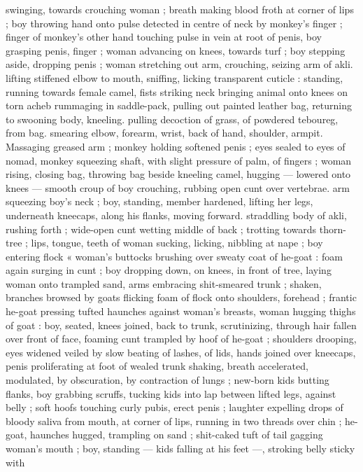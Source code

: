 swinging, towards crouching woman ; breath making blood froth at
corner of lips ; boy throwing hand onto pulse detected in centre of
neck by monkey's finger ; finger of monkey's other hand touching
pulse in vein at root of penis, boy grasping penis, finger ; woman
advancing on knees, towards turf ; boy stepping aside, dropping
penis ; woman stretching out arm, crouching, seizing arm of akli.
lifting stiffened elbow to mouth, sniffing, licking transparent cuticle :
standing, running towards female camel, fists striking neck bringing
animal onto knees on torn acheb rummaging in saddle-pack, pulling
out painted leather bag, returning to swooning body, kneeling.
pulling decoction of grass, of powdered teboureg, from bag.
smearing elbow, forearm, wrist, back of hand, shoulder, armpit.
Massaging greased arm ; monkey holding softened penis ; eyes
sealed to eyes of nomad, monkey squeezing shaft, with slight
pressure of palm, of fingers ; woman rising, closing bag, throwing
bag beside kneeling camel, hugging --- lowered onto knees ---
smooth croup of boy crouching, rubbing open cunt over vertebrae.
arm squeezing boy’s neck ; boy, standing, member hardened, lifting
her legs, underneath kneecaps, along his flanks, moving forward.
straddling body of akli, rushing forth ; wide-open cunt wetting
middle of back ; trotting towards thorn-tree ; lips, tongue, teeth of
woman sucking, licking, nibbling at nape ; boy entering flock «
woman's buttocks brushing over sweaty coat of he-goat : foam again
surging in cunt ; boy dropping down, on knees, in front of tree,
laying woman onto trampled sand, arms embracing shit-smeared
trunk ; shaken, branches browsed by goats flicking foam of flock
onto shoulders, forehead ; frantic he-goat pressing tufted haunches
against woman's breasts, woman hugging thighs of goat : boy,
seated, knees joined, back to trunk, scrutinizing, through hair fallen
over front of face, foaming cunt trampled by hoof of he-goat ;
shoulders drooping, eyes widened veiled by slow beating of lashes,
of lids, hands joined over kneecaps, penis proliferating at foot of
wealed trunk shaking, breath accelerated, modulated, by
obscuration, by contraction of lungs ; new-born kids butting flanks,
boy grabbing scruffs, tucking kids into lap between lifted legs,
against belly ; soft hoofs touching curly pubis, erect penis ; laughter
expelling drops of bloody saliva from mouth, at corner of lips,
running in two threads over chin ; he-goat, haunches hugged,
trampling on sand ; shit-caked tuft of tail gagging woman's mouth ;
boy, standing --- kids falling at his feet ---, stroking belly sticky with
